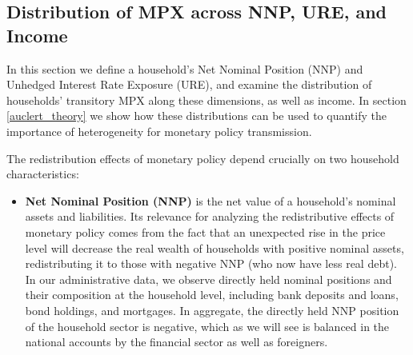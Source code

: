 \documentclass[titlepage]{\econtex}\newcommand{\texname}{ConsumptionHeterogeneity}
\begin{document}
	\subsection{Distribution of MPX across NNP, URE, and Income}
	In this section we define a household's Net Nominal Position (NNP) and Unhedged Interest Rate Exposure (URE), and examine the distribution of households' transitory MPX along these dimensions, as well as income. In section \ref{auclert_theory} we show how these distributions can be used to quantify the importance of heterogeneity for monetary policy transmission.
	
	The redistribution effects of monetary policy depend crucially on two household characteristics:
	\begin{itemize}
		\item \textbf{Net Nominal Position (NNP)} is the net value of a household's nominal assets and liabilities. Its relevance for analyzing the redistributive effects of monetary policy comes from the fact that an unexpected rise in the price level will decrease the real wealth of households with positive nominal assets, redistributing it to those with negative NNP (who now have less real debt). In our administrative data, we observe directly held nominal positions and their composition at the household level, including bank deposits and loans, bond holdings, and mortgages. In aggregate, the directly held NNP position of the household sector is negative, which as we will see is balanced in the national accounts by the financial sector as well as foreigners.

\end{itemize}
\end{document}
